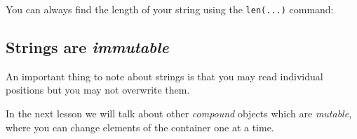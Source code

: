 \documentclass[m3380-lec-main.tex]{subfiles}
\begin{document}
\smallskip\noindent
You can always find the length of your string using the \verb|len(...)| command:
\smallskip\noindent

\subsection{Strings are \emph{immutable}}
An important thing to note about strings is that you may read individual positions but you may not overwrite them.

\smallskip\noindent

In the next lesson we will talk about other \emph{compound} objects which are \emph{mutable}, where you can change elements of the container one at a time.
\end{document}
